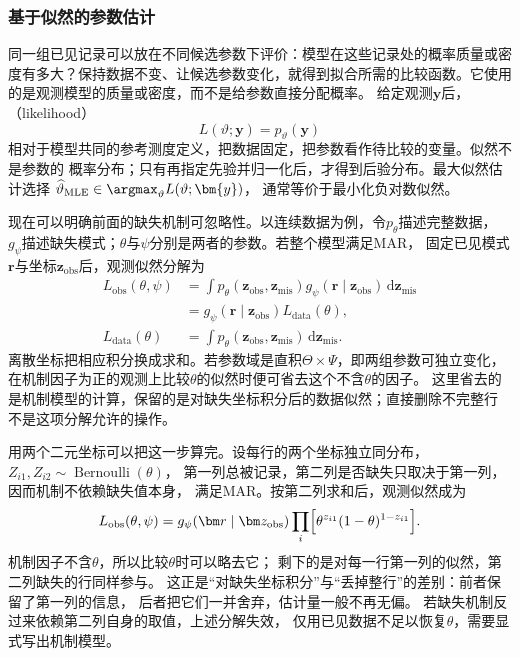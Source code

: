 \subsubsection{基于似然的参数估计}
\label{sec:statistics-likelihood-robustness}
\label{sec:statistics-bayes-hierarchy}
同一组已见记录可以放在不同候选参数下评价：模型在这些记录处的概率质量或密度有多大？保持数据不变、让候选参数变化，就得到拟合所需的比较函数。它使用的是观测模型的质量或密度，而不是给参数直接分配概率。
给定观测\(\bm{y}\)后，（likelihood）
\[
  L(\vartheta;\bm{y})=p_\vartheta(\bm{y})
\]
相对于模型共同的参考测度定义，把数据固定，把参数看作待比较的变量。似然不是参数的
概率分布；只有再指定先验并归一化后，才得到后验分布。最大似然估计选择
\(\widehat\vartheta_{\mathrm{MLE}}\in\argmax_\vartheta L(\vartheta;\bm{y})\)，
通常等价于最小化负对数似然。

现在可以明确前面的缺失机制可忽略性。以连续数据为例，令\(p_\theta\)描述完整数据，
\(g_\psi\)描述缺失模式；\(\theta\)与\(\psi\)分别是两者的参数。若整个模型满足MAR，
固定已见模式\(\bm r\)与坐标\(\bm z_{\mathrm{obs}}\)后，观测似然分解为
\begin{equation}
\begin{aligned}
 L_{\mathrm{obs}}(\theta,\psi)
 &=\int p_\theta(\bm z_{\mathrm{obs}},\bm z_{\mathrm{mis}})
       g_\psi(\bm r\mid\bm z_{\mathrm{obs}})\,\mathrm d\bm z_{\mathrm{mis}}\\
 &=g_\psi(\bm r\mid\bm z_{\mathrm{obs}})
       L_{\mathrm{data}}(\theta),\\
 L_{\mathrm{data}}(\theta)
 &=\int p_\theta(\bm z_{\mathrm{obs}},\bm z_{\mathrm{mis}})
       \,\mathrm d\bm z_{\mathrm{mis}}.
\end{aligned}
\label{eq:statistics-missing-likelihood}
\end{equation}
离散坐标把相应积分换成求和。若参数域是直积\(\Theta\times\Psi\)，即两组参数可独立变化，
在机制因子为正的观测上比较\(\theta\)的似然时便可省去这个不含\(\theta\)的因子。
这里省去的是机制模型的计算，保留的是对缺失坐标积分后的数据似然；直接删除不完整行
不是这项分解允许的操作。

用两个二元坐标可以把这一步算完。设每行的两个坐标独立同分布，
\(Z_{i1},Z_{i2}\sim\operatorname{Bernoulli}(\theta)\)，
第一列总被记录，第二列是否缺失只取决于第一列，因而机制不依赖缺失值本身，
满足MAR。按第二列求和后，观测似然成为
\[
  L_{\mathrm{obs}}(\theta,\psi)
  =g_\psi(\bm r\mid \bm z_{\mathrm{obs}})
   \prod_i\Bigl[\theta^{z_{i1}}(1-\theta)^{1-z_{i1}}\Bigr].
\]
机制因子不含\(\theta\)，所以比较\(\theta\)时可以略去它；
剩下的是对每一行第一列的似然，第二列缺失的行同样参与。
这正是“对缺失坐标积分”与“丢掉整行”的差别：前者保留了第一列的信息，
后者把它们一并舍弃，估计量一般不再无偏。
若缺失机制反过来依赖第二列自身的取值，上述分解失效，
仅用已见数据不足以恢复\(\theta\)，需要显式写出机制模型。

